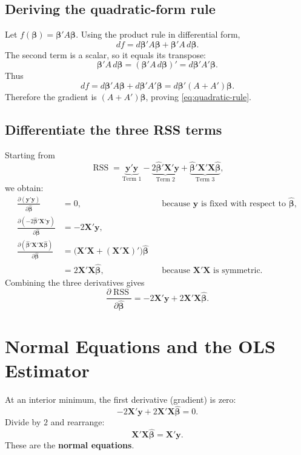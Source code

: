 \documentclass[11pt,a4paper]{article}
\numberwithin{equation}{section}
\newcommand{\bhat}{\hat{\boldsymbol{\beta}}}
\newcommand{\XX}{\mathbf{X}}
\newcommand{\yy}{\mathbf{y}}
\newcommand{\RSS}{\operatorname{RSS}}
\begin{document}
\subsection{Deriving the quadratic-form rule}
Let $f(\boldsymbol{\beta})=\boldsymbol{\beta}'A\boldsymbol{\beta}$. Using the product rule in differential form,
\[
df=d\boldsymbol{\beta}'A\boldsymbol{\beta}
+\boldsymbol{\beta}'A\,d\boldsymbol{\beta}.
\]
The second term is a scalar, so it equals its transpose:
\[
\boldsymbol{\beta}'A\,d\boldsymbol{\beta}
=(\boldsymbol{\beta}'A\,d\boldsymbol{\beta})'
=d\boldsymbol{\beta}'A'\boldsymbol{\beta}.
\]
Thus
\[
df=d\boldsymbol{\beta}'A\boldsymbol{\beta}
+d\boldsymbol{\beta}'A'\boldsymbol{\beta}
=d\boldsymbol{\beta}'(A+A')\boldsymbol{\beta}.
\]
Therefore the gradient is $(A+A')\boldsymbol{\beta}$, proving \eqref{eq:quadratic-rule}.

\subsection{Differentiate the three RSS terms}
Starting from
\[
\RSS=\underbrace{\yy'\yy}_{\text{Term 1}}
-\underbrace{2\bhat'\XX'\yy}_{\text{Term 2}}
+\underbrace{\bhat'\XX'\XX\bhat}_{\text{Term 3}},
\]
we obtain:
\begin{align*}
\frac{\partial(\yy'\yy)}{\partial\bhat}&=0,
&&\text{because $\yy$ is fixed with respect to $\bhat$},\\
\frac{\partial(-2\bhat'\XX'\yy)}{\partial\bhat}&=-2\XX'\yy,\\
\frac{\partial(\bhat'\XX'\XX\bhat)}{\partial\bhat}
&=\bigl(\XX'\XX+(\XX'\XX)'\bigr)\bhat\\
&=2\XX'\XX\bhat,
&&\text{because $\XX'\XX$ is symmetric.}
\end{align*}
Combining the three derivatives gives
\begin{equation}
    \boxed{\frac{\partial\RSS}{\partial\bhat}
    =-2\XX'\yy+2\XX'\XX\bhat.}
    \label{eq:rss-gradient}
\end{equation}

\section{Normal Equations and the OLS Estimator}

At an interior minimum, the first derivative (gradient) is zero:
\[
-2\XX'\yy+2\XX'\XX\bhat=0.
\]
Divide by $2$ and rearrange:
\begin{equation}
    \boxed{\XX'\XX\bhat=\XX'\yy.}
    \label{eq:normal}
\end{equation}
These are the \textbf{normal equations}.
\end{document}
